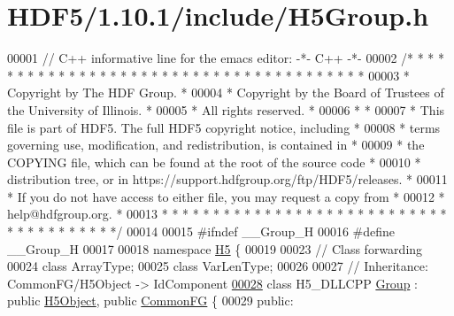 \hypertarget{_h_d_f5_21_810_81_2include_2_h5_group_8h_source}{}\section{H\+D\+F5/1.10.1/include/\+H5\+Group.h}
\label{_h_d_f5_21_810_81_2include_2_h5_group_8h_source}

\begin{DoxyCode}
00001 \textcolor{comment}{// C++ informative line for the emacs editor: -*- C++ -*-}
00002 \textcolor{comment}{/* * * * * * * * * * * * * * * * * * * * * * * * * * * * * * * * * * * * * * *}
00003 \textcolor{comment}{ * Copyright by The HDF Group.                                               *}
00004 \textcolor{comment}{ * Copyright by the Board of Trustees of the University of Illinois.         *}
00005 \textcolor{comment}{ * All rights reserved.                                                      *}
00006 \textcolor{comment}{ *                                                                           *}
00007 \textcolor{comment}{ * This file is part of HDF5.  The full HDF5 copyright notice, including     *}
00008 \textcolor{comment}{ * terms governing use, modification, and redistribution, is contained in    *}
00009 \textcolor{comment}{ * the COPYING file, which can be found at the root of the source code       *}
00010 \textcolor{comment}{ * distribution tree, or in https://support.hdfgroup.org/ftp/HDF5/releases.  *}
00011 \textcolor{comment}{ * If you do not have access to either file, you may request a copy from     *}
00012 \textcolor{comment}{ * help@hdfgroup.org.                                                        *}
00013 \textcolor{comment}{ * * * * * * * * * * * * * * * * * * * * * * * * * * * * * * * * * * * * * * */}
00014 
00015 \textcolor{preprocessor}{#ifndef \_\_Group\_H}
00016 \textcolor{preprocessor}{#define \_\_Group\_H}
00017 
00018 \textcolor{keyword}{namespace }\hyperlink{namespace_h5}{H5} \{
00019 
00023 \textcolor{comment}{// Class forwarding}
00024 \textcolor{keyword}{class }ArrayType;
00025 \textcolor{keyword}{class }VarLenType;
00026 
00027 \textcolor{comment}{//  Inheritance: CommonFG/H5Object -> IdComponent}
\hyperlink{class_h5_1_1_group}{00028} \textcolor{keyword}{class }H5\_DLLCPP \hyperlink{class_h5_1_1_group}{Group} : \textcolor{keyword}{public} \hyperlink{class_h5_1_1_h5_object}{H5Object}, \textcolor{keyword}{public} \hyperlink{class_h5_1_1_common_f_g}{CommonFG} \{
00029    \textcolor{keyword}{public}:

\end{DoxyCode}
